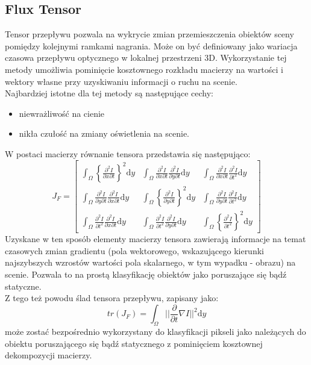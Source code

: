 \subsection{Flux Tensor}
\label{sec:FT}
Tensor przepływu pozwala na wykrycie zmian przemieszczenia obiektów sceny pomiędzy kolejnymi ramkami nagrania. Może on być definiowany jako wariacja czasowa przepływu optycznego w lokalnej przestrzeni 3D. Wykorzystanie tej metody umożliwia pominięcie kosztownego rozkładu macierzy na wartości i wektory własne przy uzyskiwaniu informacji o ruchu na scenie.\\
Najbardziej istotne dla tej metody są następujące cechy:
\begin{itemize}
\item niewrażliwość na cienie
\item nikła czułość na zmiany oświetlenia na scenie.
\end{itemize} 
W postaci macierzy równanie tensora przedstawia się następująco:
\begin{equation}
\label{eq:FT}
J_{F} =
\begin{bmatrix}
%
\int_\Omega \left\{\frac{\partial^2I}{\partial x\partial t}\right\}^2 \mathrm{d}y   &
%
\int_\Omega \frac{\partial^2I}{\partial x\partial t} \frac{\partial^2I}{\partial y\partial t} \mathrm{d}y  &
%
\int_\Omega \frac{\partial^2I}{\partial x\partial t} \frac{\partial^2I}{\partial t^2} \mathrm{d}y
\\[0.5em]
%
%
\int_\Omega \frac{\partial^2I}{\partial y\partial t} \frac{\partial^2I}{\partial x\partial t} \mathrm{d}y  &
%
\int_\Omega \left\{\frac{\partial^2I}{\partial y\partial t}\right\}^2 \mathrm{d}y   &
%
\int_\Omega \frac{\partial^2I}{\partial y\partial t} \frac{\partial^2I}{\partial t^2} \mathrm{d}y
\\[0.5em]
%
%
\int_\Omega \frac{\partial^2I}{\partial t^2} \frac{\partial^2I}{\partial x\partial t} \mathrm{d}y   &
%
\int_\Omega \frac{\partial^2I}{\partial t^2} \frac{\partial^2I}{\partial y\partial t} \mathrm{d}y   &
%
\int_\Omega \left\{\frac{\partial^2I}{\partial t^2}\right\}^2 \mathrm{d}y
\end{bmatrix}
\end{equation}
Uzyskane w ten sposób elementy macierzy tensora zawierają informacje na temat czasowych zmian gradientu (pola wektorowego, wskazującego kierunki najszybszych wzrostów wartości pola skalarnego, w tym wypadku - obrazu) na scenie. Pozwala to na prostą klasyfikację obiektów jako poruszające się bądź statyczne.\\
Z tego też powodu ślad tensora przepływu, zapisany jako:
\begin{equation}
tr(J_{F}) = 
\int_\Omega ||\frac{\partial}{\partial t}\nabla I||^2\mathrm{d}y
\end{equation}
może zostać bezpośrednio wykorzystany do klasyfikacji pikseli jako należących do obiektu poruszającego się bądź statycznego z pominięciem kosztownej dekompozycji macierzy.
